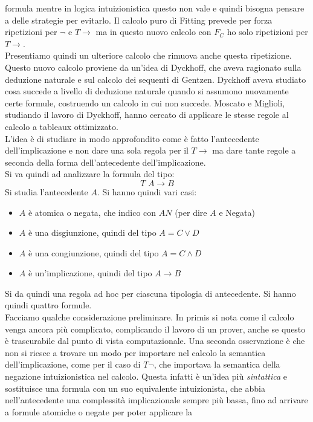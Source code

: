 \documentclass[a4paper,12pt, oneside]{book}
\begin{document}
formula mentre in logica intuizionistica questo non vale e quindi bisogna
pensare a delle strategie per evitarlo. Il calcolo puro di Fitting prevede per
forza ripetizioni per $\neg$ e $T\to$ ma in questo nuovo calcolo con $F_C$ ho
solo ripetizioni per $T\to$.\\ 
Presentiamo quindi un ulteriore calcolo che rimuova anche questa ripetizione.\\
Questo nuovo calcolo proviene da un'idea di Dyckhoff, che aveva ragionato sulla
deduzione naturale e sul calcolo dei sequenti di Gentzen. Dyckhoff aveva studiato
cosa succede a livello di deduzione naturale quando si assumono nuovamente certe
formule, costruendo un calcolo in cui non succede. Moscato e Miglioli, studiando
il lavoro di Dyckhoff, hanno cercato di applicare le stesse regole al calcolo a
tableaux ottimizzato. \\
L'idea è di studiare in modo approfondito come è fatto l'antecedente
dell'implicazione e non dare una sola regola per il $T\to$ ma dare tante regole
a seconda della forma dell'antecedente dell'implicazione.\\
Si va quindi ad analizzare la formula del tipo:
\[T\,\, A\to B\]
Si studia l'antecedente $A$. Si hanno quindi vari casi:
\begin{itemize}
  \item $A$ è atomica o negata, che indico con $AN$ (per dire $A$ e Negata)
  \item $A$ è una disgiunzione, quindi del tipo $A=C\lor D$
  \item $A$ è una congiunzione, quindi del tipo $A=C\land D$
  \item $A$ è un'implicazione, quindi del tipo $A\to B$
\end{itemize}
Si da quindi una regola ad hoc per ciascuna tipologia di antecedente. Si hanno
quindi quattro formule.\\
Facciamo qualche considerazione preliminare. In primis si nota come il calcolo
venga ancora più complicato, complicando il lavoro di un prover, anche se questo
è trascurabile dal punto di vista computazionale. Una seconda osservazione è che
non si riesce a trovare un modo per importare nel calcolo la semantica
dell'implicazione, come per il caso di $T\neg$, che importava la semantica della
negazione intuizionistica nel calcolo. Questa infatti è un'idea più
\textit{sintattica} e sostituisce una formula con un suo equivalente
intuizionista, che abbia nell'antecedente una complessità implicazionale sempre
più bassa, fino ad arrivare a formule atomiche o negate per poter applicare la
\end{document}
